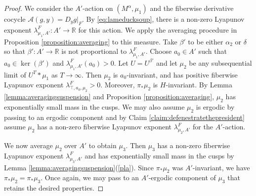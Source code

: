 \documentclass[10pt,reqno]{amsart}
\theoremstyle{Theorem}
\theoremstyle{definition}
\theoremstyle{remark}
\newcommand{\restrict}[2]{{#1}{|_{{ #2}}}}
\DeclareMathOperator{\Stab}{Stab}
\newcommand{\R}{\mathbb {R}}
\newcommand{\Sl}{\mathrm{SL}}
\def\calA{\mathcal A}
\def\red{\color{red}}
\begin{document}
\begin{proof}
We consider the $A'$-action on $(M^\alpha, \mu_1)$ and the fiberwise derivative cocycle $\calA(g,y) = \restrict{D_y g}{F}$.
By \eqref{eq:lameducksoup}, there is a   non-zero  Lyapunov exponent
$\lambda_{ \mu_1,A'}^F\colon A'\to \R$ for this action.   We apply the averaging procedure in   Proposition \ref{proposition:averaging} to this measure.
    Take  $\beta'$ to be either $\alpha_2$ or $\delta$ so that $\beta'\colon A'\to \R$ is not proportional to $\lambda_{ \mu_1,A'}^F$.
Choose $a_0\in A'$ such that $a_0 \in \ker(\beta')$ and $\lambda_{ \mu_1,A'}^F(a_0)>0$.
Let $U = U^{\beta'}$ and let $\mu_2$ be any subsequential limit  of $U^T\ast \mu_1$ as $T \rightarrow \infty$. Then
 $\mu_2$  is  $a_0$-invariant, and has positive fiberwise Lyapunov exponent $ \lambda_{\top, a_0, \mu_2}^F >0$.  Moreover,
 $\pi_*\mu_2$ is $H$-invariant.
By Lemma \ref{lemma:averagingsuspension}  and Proposition \ref{proposition:averaging}, $\mu_2$ has exponentially small mass in the cusps.
We may also assume $\mu_2$ is ergodic by passing to an ergodic component and by Claim \ref{claim:defenestratethepresident} assume $\mu_2$ has a non-zero fiberwise  Lyapunov exponent $\lambda_{ \mu_2,A'}^F$ for the $A'$-action.







 We now average $\mu_2$ over $A'$ to obtain $\mu_3$.   Then $\mu_3$ has a non-zero fiberwise  Lyapunov exponent $\lambda_{\mu_3,A'}^F$ and has  exponentially small mass in the cusps by   Lemma \ref{lemma:averagingsuspension}(\ref{pla}).   Since $\pi_*\mu_2$ was $A'$-invariant, we have  $\pi_*\mu_2= \pi_*\mu_3$.  Once again, we may pass to an $A'$-ergodic component of $\mu_3$ that retains the desired properties.


\end{proof}
\end{document}
